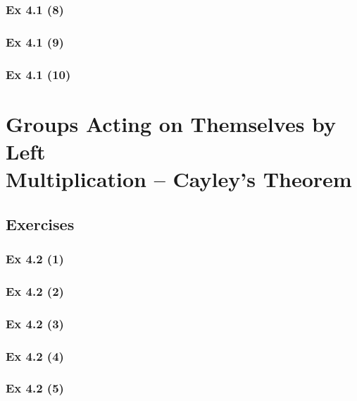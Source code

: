\subsubsection{Ex 4.1 (8)}\label{sec:Ex_4.1.8}

\subsubsection{Ex 4.1 (9)}\label{sec:Ex_4.1.9}

\subsubsection{Ex 4.1 (10)}\label{sec:Ex_4.1.10}

\newpage		%

\section{Groups Acting on Themselves by Left\\ Multiplication -- Cayley's Theorem}\label{sec:4.2}	
\subsection*{Exercises}\label{sec:4.2_Exercises}

\subsubsection{Ex 4.2 (1)}\label{sec:Ex_4.2.1}

\subsubsection{Ex 4.2 (2)}\label{sec:Ex_4.2.2}

\subsubsection{Ex 4.2 (3)}\label{sec:Ex_4.2.3}

\subsubsection{Ex 4.2 (4)}\label{sec:Ex_4.2.4}

\subsubsection{Ex 4.2 (5)}\label{sec:Ex_4.2.5}

